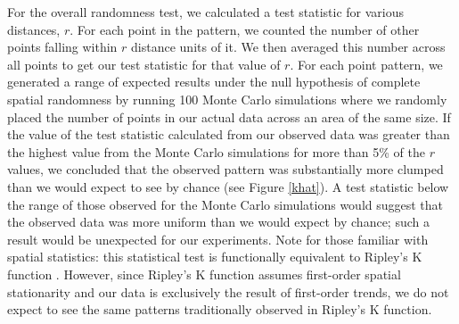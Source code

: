 For the overall randomness test, we calculated a test statistic for various distances, $r$. For each point in the pattern, we counted the number of other points falling within $r$ distance units of it. We then averaged this number across all points to get our test statistic for that value of $r$. For each point pattern, we generated a range of expected results under the null hypothesis of complete spatial randomness by running 100 Monte Carlo simulations where we randomly placed the number of points in our actual data across an area of the same size. If the value of the test statistic calculated from our observed data was greater than the highest value from the Monte Carlo simulations for more than 5\% of the $r$ values, we concluded that the observed pattern was substantially more clumped than we would expect to see by chance (see Figure \ref{khat}). A test statistic below the range of those observed for the Monte Carlo simulations would suggest that the observed data was more uniform than we would expect by chance; such a result would be unexpected for our experiments. Note for those familiar with spatial statistics: this statistical test is functionally equivalent to Ripley's K function \citep{ripley_mapped_1981}. However, since Ripley's K function assumes first-order spatial stationarity and our data is exclusively the result of first-order trends, we do not expect to see the same patterns traditionally observed in Ripley's K function.


